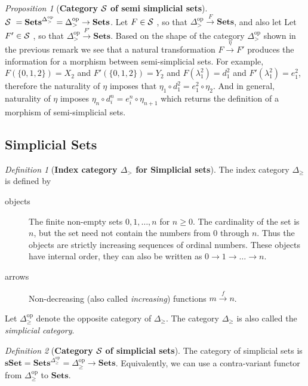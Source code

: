 \documentclass[10pt]{article}
\newcommand{\onearrow}[3]{\mbox{$#1 \stackrel{#2}{\longrightarrow} #3$}}
\newcommand{\calS}{\mbox{${\cal S}\ $}}
\theoremstyle{remark}
\newtheorem{definition}{Definition}
\newtheorem{proposition}{Proposition}
\begin{document}
\begin{proposition}[\textbf{Category \calS of semi simplicial sets}]
$\calS = \mathbf{Sets}^{\Delta_{>}^{\text{op}}} = \Delta_{>}^{\text{op}} \rightarrow \mathbf{Sets}$. Let $F \in \calS$,
so that \onearrow{ \Delta_{>}^{\text{op}}}{F}{\mathbf{Sets}}, and also let Let $F' \in \calS$,
so that \onearrow{ \Delta_{>}^{\text{op}}}{F'}{\mathbf{Sets}}.
Based on the shape of the category $\Delta_{>}^{\text{op}}$ shown in the previous remark we see that a natural transformation \onearrow{F}{\eta}{F'} produces the information for a morphism between semi-simplicial sets.
For example, $F(\{0,1,2\}) = X_2$ and $F'(\{0,1,2\}) = Y_2$ and $F(\lambda^2_1) = d^2_1$ and $F'(\lambda^2_1) = e^2_1$, therefore the naturality of $\eta$ imposes that $\eta_1 \circ  d^2_1 = e^2_1 \circ \eta_2$.
And in general, naturality of $\eta$ imposes $\eta_n \circ  d^n_i = e^n_i \circ \eta_{n+1}$
which returns the definition of a morphism of semi-simplicial sets.
\end{proposition}

\subsection{Simplicial Sets}

\begin{definition}[\textbf{Index category $\Delta_{>}$ for Simplicial sets}]
The index category $\Delta_{\geq}$ is defined by
\begin{description}
\item [objects] The finite non-empty sets ${0,1, \ldots , n}$ for $n \geq 0$. The cardinality of the set is $n$, but the set need not contain the numbers from $0$ through $n$. Thus the objects are strictly increasing sequences of ordinal numbers.
These objects have internal order, they can also be written as $0 \rightarrow 1 \rightarrow \ldots \rightarrow n$.
\item [arrows] Non-decreasing (also called \emph{increasing}) functions \onearrow{m}{f}{n}.
\end{description}
Let $\Delta_{\geq}^{\text{op}}$ denote the opposite category of $\Delta_{\geq}$.
The category $\Delta_{\geq}$ is also called the \emph{simplicial category}.
\end{definition}

\begin{definition}[\textbf{Category \calS of simplicial sets}]
The category of simplicial sets is $\mathbf{sSet} = \mathbf{Sets}^{\Delta_{\geq}^{\text{op}}} = \Delta_{\geq}^{\text{op}} \rightarrow \mathbf{Sets}$. Equivalently, we can use a contra-variant functor from $\Delta_{\geq}^{\text{op}}$ to $\mathbf{Sets}$.
\end{definition}
\end{document}
